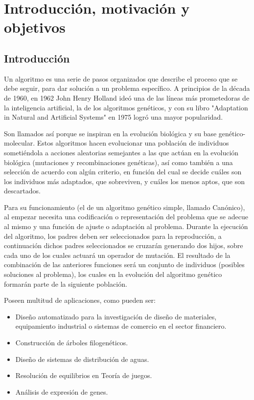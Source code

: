 \chapter{Introducción, motivación y objetivos}


\section{Introducción}
\bigskip

Un algoritmo es una serie de pasos organizados que describe el proceso que se debe seguir, para dar solución a un problema específico. A principios de la década de 1960, en 1962 John Henry Holland ideó una de las líneas más prometedoras de la inteligencia artificial, la de los algoritmos genéticos, y con su libro "Adaptation in Natural and Artificial Systems" en 1975 logró una mayor popularidad. 

Son llamados así porque se inspiran en la evolución biológica y su base genético-molecular. Estos algoritmos hacen evolucionar una población de individuos sometiéndola a acciones aleatorias semejantes a las que actúan en la evolución biológica (mutaciones y recombinaciones genéticas), así como también a una selección de acuerdo con algún criterio, en función del cual se decide cuáles son los individuos más adaptados, que sobreviven, y cuáles los menos aptos, que son descartados.

\bigskip
Para su funcionamiento (el de un algoritmo genético simple, llamado Canónico), al empezar necesita una codificación o representación del problema que se adecue al mismo y una función de ajuste o adaptación al problema. Durante la ejecución del algoritmo, los padres deben ser seleccionados para la reproducción, a continuación dichos padres seleccionados se cruzarán generando dos hijos, sobre cada uno de los cuales actuará un operador de mutación. El resultado de la combinación de las anteriores funciones será un conjunto de individuos (posibles soluciones al problema), los cuales en la evolución del algoritmo genético formarán parte de la siguiente población.

\bigskip
Poseen multitud de aplicaciones, como pueden ser:

\begin{itemize}
	\item Diseño automatizado para la investigación de diseño de materiales, equipamiento industrial o sistemas de comercio en el sector financiero.
	\item Construcción de árboles filogenéticos.
	\item Diseño de sistemas de distribución de aguas.
	\item Resolución de equilibrios en Teoría de juegos.
	\item Análisis de expresión de genes.
\end{itemize}

